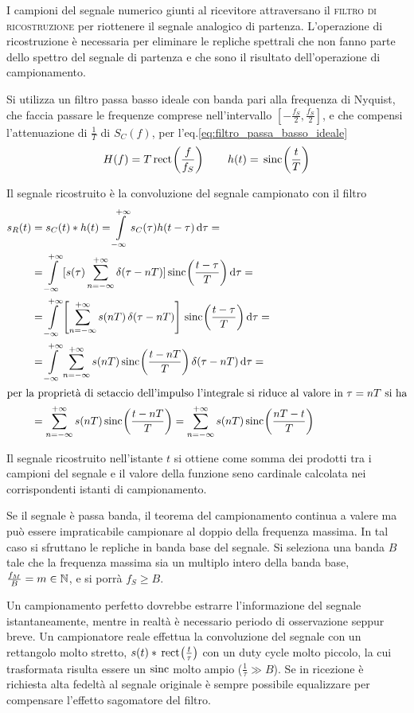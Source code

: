 I campioni del segnale numerico giunti al ricevitore attraversano il \textsc{filtro di ricostruzione} per riottenere il segnale analogico di partenza. L'operazione di ricostruzione è necessaria per eliminare le repliche spettrali che non fanno parte dello spettro del segnale di partenza e che sono il risultato dell'operazione di campionamento.

Si utilizza un filtro passa basso ideale con banda pari alla frequenza di Nyquist, che faccia passare le frequenze comprese nell'intervallo $[-\frac{f_S}{2},\frac{f_S}{2}]$, e che compensi l'attenuazione di $\frac{1}{T}$ di $S_C(f)$, per l'eq.\ref{eq:filtro_passa_basso_ideale}
\begin{equation}
H(f)=T \,{\operatorname{rect}}^{}\!\left({\frac{f}{f_S}}\right)\qquad h(t)=\,{\operatorname{sinc}}^{}\!\left({\frac{t}{T}}\right)
\end{equation}

Il segnale ricostruito è la convoluzione del segnale campionato con il filtro
\begin{equation}
\begin{split}
	s_R(t)&=s_C(t)\ast h(t)=\intinf{s_C(\tau)h(t-\tau)}{\tau}=\\
	&=\intinf{[s(\tau)\sum_{n=-\infty}^{+\infty}\impulse(\tau-n T)]\sinc{\frac{t-\tau}{T}}}{\tau}=\\
	&=\intinf{\left[\sum_{n=-\infty}^{+\infty}s(n T)\impulse(\tau-n T)\right]\sinc{\frac{t-\tau}{T}}}{\tau}=\\
	&=\intinf{\sum_{n=-\infty}^{+\infty}s(n T)\sinc{\frac{t-n T}{T}}\impulse(\tau-n T)}{\tau}=\\
	\intertext{per la proprietà di setaccio dell'impulso l'integrale si riduce al valore in $\tau=n T$ si ha}
	&=\sum_{n=-\infty}^{+\infty}s(n T)\sinc{\frac{t-n T}{T}}=\sum_{n=-\infty}^{+\infty}s(n T)\sinc{\frac{n T-t}{T}}
\end{split}
\end{equation}

Il segnale ricostruito nell'istante $t$ si ottiene come somma dei prodotti tra i campioni del segnale e il valore della funzione seno cardinale calcolata nei corrispondenti istanti di campionamento.

\begin{nota}
	Se il segnale è passa banda, il teorema del campionamento continua a valere ma può essere impraticabile campionare al doppio della frequenza massima. In tal caso si sfruttano le repliche in banda base del segnale. Si seleziona una banda $B$ tale che la frequenza massima sia un multiplo intero della banda base, $\frac{f_M}{B}=m\in\mathbb{N}$, e si porrà $f_S\geq B$.
\end{nota}
\begin{nota}
	Un campionamento perfetto dovrebbe estrarre l'informazione del segnale istantaneamente, mentre in realtà è necessario periodo di osservazione seppur breve. Un campionatore reale effettua la convoluzione del segnale con un rettangolo molto stretto, $s(t)\ast\,{\operatorname{rect}}^{}\!\left({\frac{t}{\tau}}\right)$ con un duty cycle molto piccolo, la cui trasformata risulta essere un $\operatorname{sinc}$ molto ampio ($\frac{1}{\tau}\gg B$). Se in ricezione è richiesta alta fedeltà al segnale originale è sempre possibile equalizzare per compensare l'effetto sagomatore del filtro.
\end{nota}

